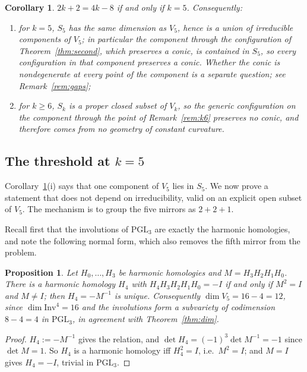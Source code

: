 \documentclass[11pt,a4paper]{article}
\theoremstyle{plain}
\newtheorem{proposition}[theorem]{Proposition}
\newtheorem{corollary}[theorem]{Corollary}
\theoremstyle{definition}
\theoremstyle{remark}
\newcommand{\PGL}{\mathrm{PGL}}
\begin{document}
\begin{corollary}\label{cor:threshold}
$2k+2=4k-8$ if and only if $k=5$. Consequently:
\begin{enumerate}[label=\textup{(\roman*)},nosep]
  \item for $k=5$, $S_5$ has the same dimension as $V_5$, hence is a union of
        irreducible components of $V_5$; in particular the component through the
        configuration of Theorem~\ref{thm:second}, which preserves a conic, is
        contained in $S_5$, so every configuration in \emph{that component}
        preserves a conic. Whether the conic is nondegenerate at every point of the
        component is a separate question; see Remark~\ref{rem:gaps};
  \item for $k\ge6$, $S_k$ is a proper closed subset of $V_k$, so the generic
        configuration on the component through the point of Remark~\ref{rem:k6}
        preserves no conic, and therefore comes from no geometry of constant
        curvature.
\end{enumerate}
\end{corollary}

\subsection{The threshold at $k=5$}

Corollary~\ref{cor:threshold}(i) says that one component of $V_5$ lies in $S_5$. We
now prove a statement that does not depend on irreducibility, valid on an explicit
open subset of $V_5$. The mechanism is to group the five mirrors as $2+2+1$.

Recall first that the involutions of $\PGL_3$ are exactly the harmonic homologies,
and note the following normal form, which also removes the fifth mirror from the
problem.

\begin{proposition}\label{prop:reduction}
Let $H_0,\dots,H_3$ be harmonic homologies and $M=H_3H_2H_1H_0$. There is a
harmonic homology $H_4$ with $H_4H_3H_2H_1H_0=-I$ if and only if $M^2=I$ and
$M\neq I$; then $H_4=-M^{-1}$ is unique. Consequently $\dim V_5=16-4=12$, since
$\dim\mathrm{Inv}^4=16$ and the involutions form a subvariety of codimension
$8-4=4$ in $\PGL_3$, in agreement with Theorem~\ref{thm:dim}.
\end{proposition}

\begin{proof}
$H_4:=-M^{-1}$ gives the relation, and $\det H_4=(-1)^3\det M^{-1}=-1$ since
$\det M=1$. So $H_4$ is a harmonic homology iff $H_4^2=I$, i.e.\ $M^2=I$; and
$M=I$ gives $H_4=-I$, trivial in $\PGL_3$.
\end{proof}
\end{document}
